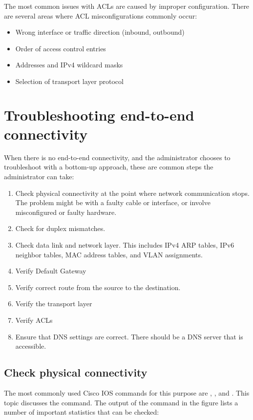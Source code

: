 The most common issues with ACLs are caused by improper configuration. There are several areas where ACL misconfigurations commonly occur:

\begin{itemize}
\item Wrong interface or traffic direction (inbound, outbound)
\item Order of access control entries
\item Addresses and IPv4 wildcard masks
\item Selection of transport layer protocol
\end{itemize}

\section{Troubleshooting end-to-end connectivity}


When there is no end-to-end connectivity, and the administrator chooses to troubleshoot with a bottom-up approach, these are common steps the administrator can take:

\begin{enumerate}
\item Check physical connectivity at the point where network communication stops. The problem might be with a faulty cable or interface, or involve misconfigured or faulty hardware.
\item Check for duplex mismatches.
\item Check data link and network layer. This includes IPv4 ARP tables, IPv6 neighbor tables, MAC address tables, and VLAN assignments.
\item Verify Default Gateway
\item Verify correct route from the source to the destination. 
\item Verify the transport layer
\item Verify ACLs
\item Ensure that DNS settings are correct. There should be a DNS server that is accessible.
\end{enumerate}

\subsection{Check physical connectivity}

The most commonly used Cisco IOS commands for this purpose are , , and . This topic discusses the  command. The output of the  command in the figure lists a number of important statistics that can be checked:


